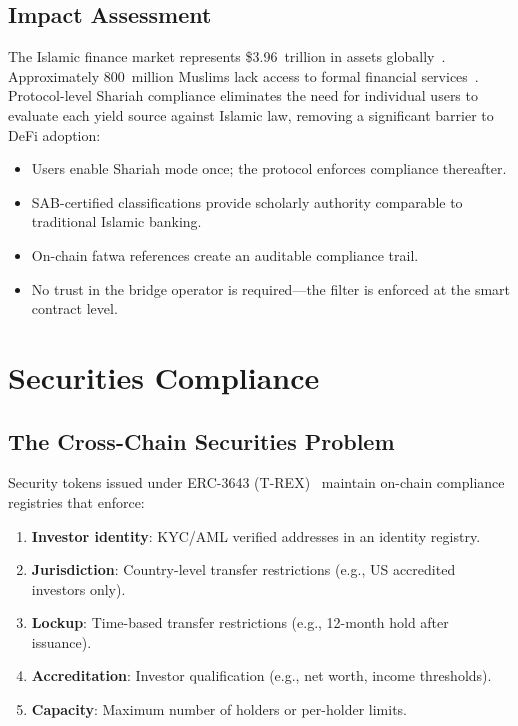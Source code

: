 \documentclass[11pt,twocolumn]{article}
\theoremstyle{definition}
\begin{document}
\subsection{Impact Assessment}

The Islamic finance market represents \$3.96~trillion in assets globally~\cite{ifdi2024}. Approximately 800~million Muslims lack access to formal financial services~\cite{worldbank2022}. Protocol-level Shariah compliance eliminates the need for individual users to evaluate each yield source against Islamic law, removing a significant barrier to DeFi adoption:

\begin{itemize}[nosep]
  \item Users enable Shariah mode once; the protocol enforces compliance thereafter.
  \item SAB-certified classifications provide scholarly authority comparable to traditional Islamic banking.
  \item On-chain fatwa references create an auditable compliance trail.
  \item No trust in the bridge operator is required---the filter is enforced at the smart contract level.
\end{itemize}

\section{Securities Compliance}
\label{sec:securities}

\subsection{The Cross-Chain Securities Problem}

Security tokens issued under ERC-3643 (T-REX)~\cite{erc3643} maintain on-chain compliance registries that enforce:

\begin{enumerate}[nosep]
  \item \textbf{Investor identity}: KYC/AML verified addresses in an identity registry.
  \item \textbf{Jurisdiction}: Country-level transfer restrictions (e.g., US accredited investors only).
  \item \textbf{Lockup}: Time-based transfer restrictions (e.g., 12-month hold after issuance).
  \item \textbf{Accreditation}: Investor qualification (e.g., net worth, income thresholds).
  \item \textbf{Capacity}: Maximum number of holders or per-holder limits.
\end{enumerate}
\end{document}
